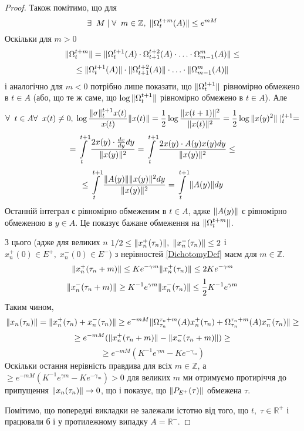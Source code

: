 \documentclass[14pt]{extarticle} %
\let\oldforall\forall
\renewcommand{\forall}{\oldforall\;}
\let\oldexists\exists
\renewcommand{\exists}{\oldexists\;}
\begin{document}
\begin{proof}
	Також помітимо, що для 
	\[\exists M\mid\forall m\in\mathbb{Z},\;\mynorm{\Omega_t^{t+m}(A)}\leq e^{mM}\]
	Оскільки для $m>0$
	\[\|\Omega_t^{t+m}\|=\|\Omega_t^{t+1}(A)\cdot\Omega_{t+1}^{t+2}(A)\cdot\hdots\cdot\Omega_{m-1}^{m}(A)\|\leq\]
	\[\leq \|\Omega_t^{t+1}(A)\|\cdot\|\Omega_{t+1}^{t+2}(A)\|\cdot\hdots\cdot\|\Omega_{m-1}^{m}(A)\|\]
	і аналогічно для $m<0$ потрібно лише показати, що $\|\Omega_t^{t+1}\|$ рівномірно обмежено в $t\in A$ (або,
	що те ж саме, що $\log\|\Omega_t^{t+1}\|$ рівномірно обмежено в $t\in A$). Але
	\[\forall t\in A\forall x(t)\neq 0,\; \log\frac{\mynorm\sigma_t^{t+1}x(t)}{x(t)}{\mynorm{x(t)}}=\frac{1}{2}\log\frac{\mynorm{x(t+1)}^2}
	{\mynorm{x(t)}^2}=\frac{1}{2}\log\mynorm{x(y)^2}\mid_t^{t+1}=\]
	\[=\int_t^{t+1}\frac{2 x(y)\cdot\frac{dx}{dy}dy}{\mynorm{x(y)}^2}=\int_t^{t+1}\frac{2 x(y)\cdot A(y)x(y)dy}{\mynorm{x(y)}^2}\leq\]
	\[\leq\int_t^{t+1}\frac{\mynorm{A(y)}\mynorm{x(y)}^2dy}{\mynorm{x(y)}^2}=\int_t^{t+1}\mynorm{A(y)}dy\]
	Останній інтеграл є рівномірно обмеженим в $t\in A$, адже $\|A(y)\|$ є рівномірно обмеженою в $y\in A$. Це показує бажане обмеження
	на $\|\Omega_t^{t+m}\|$.

	З цього (адже для великих $n$ $1/2\leq\|x_n^+(\tau_n)\|,\;\|x_n^-(\tau_n)\|\leq 2$ і $x_n^+(0)\in E^+,\;x_n^-(0)\in E^-$) 
	з нерівностей \ref{DichotomyDef} маєм
	для $m\in\mathbb{Z}$.
	\[\|x_n^+(\tau_n+m)\|\leq Ke^{-\gamma m}\|x_n^+(\tau_n)\|\leq 2Ke^{-\gamma m}\]
	\[\|x_n^-(\tau_n+m)\|\geq K^{-1}e^{\gamma m}\|x_n^-(\tau_n)\|\leq \frac{1}{2}K^{-1}e^{\gamma m}\]
	Таким чином,
	\[\|x_n(\tau_n)\|=
	\|x_n^+(\tau_n)+x_n^-(\tau_n)\|\geq e^{-mM}\|\Omega^{\tau_n+m}_{\tau_n}(A)x_n^+(\tau_n)+
	\Omega^{\tau_n+m}_{\tau_n}(A)x_n^-(\tau_n)\|\geq\]\[\geq e^{-mM}(\|x_n^+(\tau_n+m)\|-\|x_n^-(\tau_n+m)\|)\geq\]
	\[\geq e^{-mM}(K^{-1}e^{\gamma m}-Ke^{-\gamma_m})\]
	Оскільки остання нерівність правдива для всіх $m\in\mathbb{Z}$, а $\geq e^{-mM}(K^{-1}e^{\gamma m}-Ke^{-\gamma_m})>0$ для великих
	$m$ ми отримуємо протиріччя до припущення $\|x_n(\tau_n)\|\to 0$, що і показує, що $\|P_{E^+}(\tau)\|$ обмежена $\tau$.

	Помітимо, що попередні викладки не залежали істотно від того, що $t,\;\tau\in\mathbb{R}^+$ і працювали б і у протилежному випадку $
	A=\mathbb{R}^-$. 


\end{proof}
\end{document}
